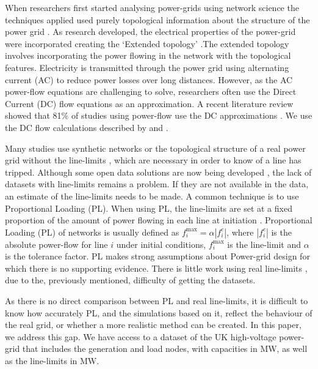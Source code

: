 \documentclass{article}
\begin{document}
When researchers first started analysing power-grids using network science the techniques applied used purely topological information about the structure of the power grid \cite{Cuadra2015}. As research developed, the electrical properties of the power-grid were incorporated creating the `Extended topology' \cite{Bompard2009}.The extended topology involves incorporating the power flowing in the network with the topological features. Electricity is transmitted through the power grid using alternating current (AC) to reduce power losses over long distances. However, as the AC power-flow equations are challenging to solve, researchers often use the Direct Current (DC) flow equations as an approximation. A recent literature review showed that 81\% of studies using power-flow use the DC approximations \cite{Cuadra2015}.
We use the DC flow calculations described by \cite{Pepyne2007} and \cite{Arianos2008}.

Many studies use synthetic networks \cite{Pepyne2007, Arianos2008, Wu2017, Hines2008} or the topological structure of a real power grid without the line-limits \cite{Yan2015, Wu2017, Buldyrev2010, Kinney2005, Schafer2018}, which are necessary in order to know of a line has tripped. Although some open data solutions are now being developed \cite{Medjroubi2017}, the lack of datasets with line-limits remains a problem.
If they are not available in the data, an estimate of the line-limits needs to be made. A common technique is to use Proportional Loading (PL). When using PL, the line-limits are set at a fixed proportion of the amount of power flowing in each line at initiation \cite{Motter, Kinney2005, Pepyne2007, Yan2015, Zhu2014, Koc2014, Ouyang2014}. Proportional Loading (PL) of networks is usually defined as $f_i^\text{max} = \alpha \left | f_{i}^c \right |$, where  $\left | f_i^c \right |$ is the absolute power-flow for line $i$ under initial conditions, $f_i^\text{max}$ is the line-limit and $\alpha$ is the tolerance factor. PL makes strong assumptions about Power-grid design for which there is no supporting evidence. There is little work using real line-limits \cite{Hines2010}, due to the, previously mentioned, difficulty of getting the datasets.

As there is no direct comparison between PL and real line-limits, it is difficult to know how accurately PL, and the simulations based on it, reflect the behaviour of the real grid, or whether a more realistic method can be created. In this paper, we address this gap. We have access to a dataset of the UK high-voltage power-grid that includes the generation and load nodes, with capacities in MW, as well as the line-limits in MW. 
\end{document}

